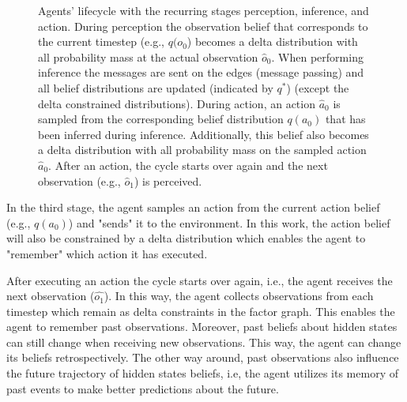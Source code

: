 \begin{figure}[!htbp]
{
    }

    \tikzexternalenable

    \caption{Agents' lifecycle with the recurring stages perception, inference, and action. During perception the observation belief that corresponds to the current timestep (e.g., \(q(o_0\)) becomes a delta distribution with all probability mass at the actual observation \(\hat{o}_0\). When performing inference the messages are sent on the edges (message passing) and all belief distributions are updated (indicated by \(q^*\)) (except the delta constrained distributions). During action, an action \(\hat{a}_0\) is sampled from the corresponding belief distribution \(q(a_0)\) that has been inferred during inference. Additionally, this belief also becomes a delta distribution with all probability mass on the sampled action \(\hat{a}_0\). After an action, the cycle starts over again and the next observation (e.g., \(\hat{o}_1\)) is perceived.}
    \label{fig:30}
\end{figure}

In the third stage, the agent samples an action from the current action belief (e.g., \(q(a_0)\)) and "sends" it to the environment. In this work, the action belief will also be constrained by a delta distribution which enables the agent to "remember" which action it has executed.

After executing an action the cycle starts over again, i.e., the agent receives the next observation (\(\hat {o_1}\)). In this way, the agent collects observations from each timestep which remain as delta constraints in the factor graph. This enables the agent to remember past observations. Moreover, past beliefs about hidden states can still change when receiving new observations. This way, the agent can change its beliefs retrospectively. The other way around, past observations also influence the future trajectory of hidden states beliefs, i.e, the agent utilizes its memory of past events to make better predictions about the future.

